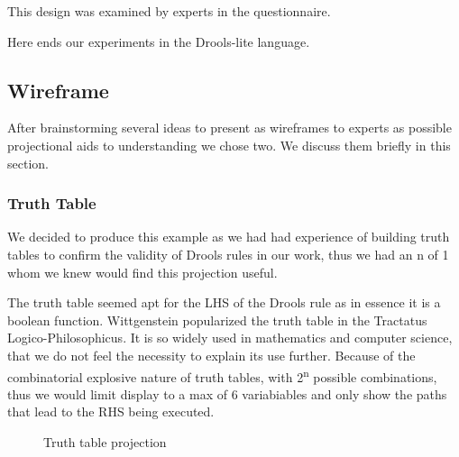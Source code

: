 This design was examined by experts in the questionnaire.

Here ends our experiments in the Drools-lite language.

\subsection{Wireframe}

After brainstorming several ideas to present as wireframes to experts as possible projectional aids to understanding we chose two.
We discuss them briefly in this section.

\subsubsection{Truth Table}
We decided to produce this example as we had had experience of building truth tables to confirm the validity of Drools rules in our work, thus we had an n of 1 whom we knew would find this projection useful.

The truth table seemed apt for the LHS of the Drools rule as in essence it is a boolean function.
Wittgenstein popularized the truth table in the Tractatus Logico-Philosophicus\cite{wittgenstein2013tractatus}.
It is so widely used in mathematics and computer science, that we do not feel the necessity to explain its use further.
Because of the combinatorial explosive nature of truth tables, with 2\textsuperscript{n} possible combinations, thus we would limit display to a max of 6 variabiables and only show the paths that lead to the RHS being executed.

\begin{figure}[h]
    \centering
    \caption{Truth table projection}
    \label{fig:TruthTableProjection}
\end{figure}


